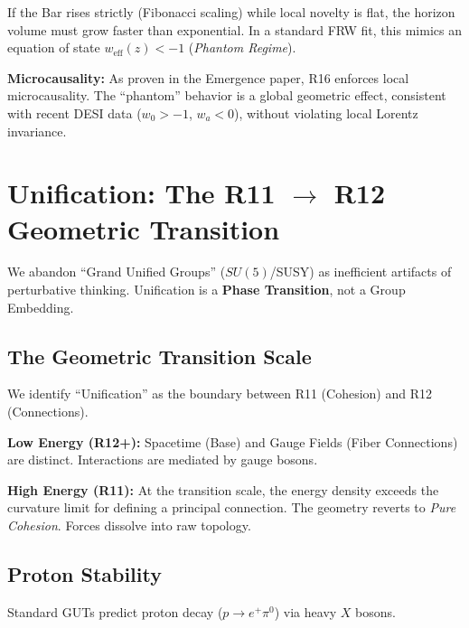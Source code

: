 \documentclass[11pt,a4paper]{article}
\theoremstyle{definition}
\theoremstyle{plain}
\theoremstyle{remark}
\begin{document}
If the Bar rises strictly (Fibonacci scaling) while local novelty is flat, the horizon volume must grow faster than exponential. In a standard FRW fit, this mimics an equation of state $w_{\mathrm{eff}}(z) < -1$ (\emph{Phantom Regime}).

\textbf{Microcausality:} As proven in the Emergence paper, R16 enforces local microcausality. The ``phantom'' behavior is a global geometric effect, consistent with recent DESI data ($w_0 > -1$, $w_a < 0$), without violating local Lorentz invariance.

\section{Unification: The R11 \texorpdfstring{$\to$}{→} R12 Geometric Transition}

We abandon ``Grand Unified Groups'' ($SU(5)$/SUSY) as inefficient artifacts of perturbative thinking. Unification is a \textbf{Phase Transition}, not a Group Embedding.

\subsection{The Geometric Transition Scale}

We identify ``Unification'' as the boundary between R11 (Cohesion) and R12 (Connections).

\textbf{Low Energy (R12+):} Spacetime (Base) and Gauge Fields (Fiber Connections) are distinct. Interactions are mediated by gauge bosons.

\textbf{High Energy (R11):} At the transition scale, the energy density exceeds the curvature limit for defining a principal connection. The geometry reverts to \emph{Pure Cohesion}. Forces dissolve into raw topology.

\subsection{Proton Stability}

Standard GUTs predict proton decay ($p \to e^+ \pi^0$) via heavy $X$ bosons.
\end{document}
